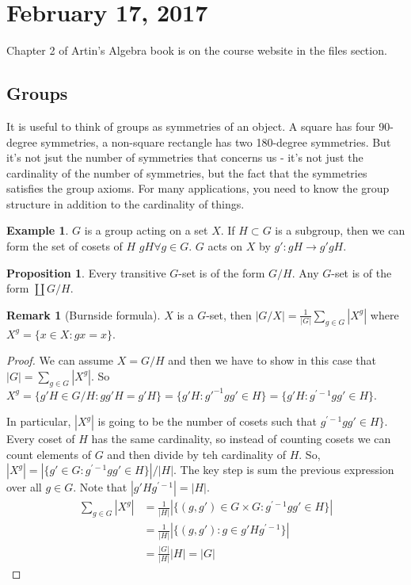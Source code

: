 \documentclass[12pt]{article}
\theoremstyle{definition}
\newtheorem{prop}{Proposition}
\newtheorem{exmp}{Example}[section]
\newtheorem{remark}{Remark}
\begin{document}
\section{February 17, 2017}

Chapter 2 of Artin's Algebra book is on the course website in the files
section.

\subsection{Groups}

It is useful to think of groups as symmetries of an object. A square has four
90-degree symmetries, a non-square rectangle has two 180-degree symmetries. But
it's not jsut the number of symmetries that concerns us - it's not just the
cardinality of the number of symmetries, but the fact that the symmetries
satisfies the group axioms. For many applications, you need to know the group
structure in addition to the cardinality of things.

\begin{exmp}
    $G$ is a group acting on a set $X$. If $H \subset G$ is a subgroup, then we
    can form the set of cosets of $H$ $gH \forall g \in G$. $G$ acts on $X$ by
    $g': gH \rightarrow g'gH$.
\end{exmp}

\begin{prop}
    Every transitive $G$-set is of the form $G/H$. Any $G$-set is of the form
    $\coprod G/H$. 
\end{prop}

\begin{remark}[Burnside formula]
    $X$ is a $G$-set, then $|G/X| = \frac{1}{|G|} \sum_{g \in G} |X^g|$ where
    $X^g = \{ x \in X: gx = x\}$.
\end{remark}

\begin{proof}
    We can assume $X = G/H$ and then we have to show in this case that $|G| =
    \sum_{g \in G} |X^g|$. So $X^g = \{g'H \in G/H : gg'H = g'H \} = \{g'H :
        g'^{-1}gg' \in H \} = \{g'H : g^{'-1}gg' \in H\}$.

    In particular, $|X^g|$ is going to be the number of cosets such that
    $g^{'-1}gg' \in H\}$. Every coset of $H$ has the same cardinality, so
    instead of counting cosets we can count elements of $G$ and then divide by
    teh cardinality of $H$. So, $|X^g| = |\{g' \in G : g^{'-1}gg' \in H\}| /
    |H|$. The key step is sum the previous expression over all $g \in G$. Note
    that $|g'Hg^{'-1}| = |H|$.
    \begin{align*}
        \sum_{g \in G} |X^g| &= \frac{1}{|H|} |\{(g, g') \in G \times G : g^{'-1}gg' \in H\}|\\
        &= \frac{1}{|H|} |\{(g, g') : g \in g'Hg^{'-1}\}| \\
        &= \frac{|G|}{|H|}|H|= |G| 
    \end{align*}
\end{proof}
\end{document}

